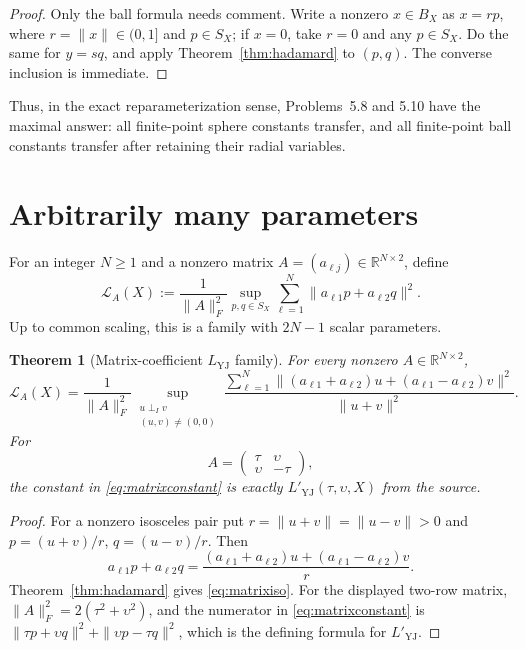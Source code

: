 \documentclass[11pt]{article}
\newtheorem{theorem}{Theorem}
\newcommand{\R}{\mathbb R}
\newcommand{\SX}{S_X}
\newcommand{\BX}{B_X}
\newcommand{\perpI}{\mathrel{\perp_I}}
\newcommand{\Lcal}{\mathcal L}
\begin{document}
\begin{proof}
Only the ball formula needs comment.  Write a nonzero $x\in\BX$ as
$x=r p$, where $r=\|x\|\in(0,1]$ and $p\in\SX$; if $x=0$, take $r=0$ and
any $p\in\SX$.  Do the same for $y=sq$, and apply
Theorem~\ref{thm:hadamard} to $(p,q)$.  The converse inclusion is immediate.
\end{proof}

Thus, in the exact reparameterization sense, Problems~5.8 and 5.10 have the
maximal answer: all finite-point sphere constants transfer, and all
finite-point ball constants transfer after retaining their radial variables.

\section{Arbitrarily many parameters}

For an integer $N\geq1$ and a nonzero matrix
$A=(a_{\ell j})\in\R^{N\times2}$, define
\begin{equation}\label{eq:matrixconstant}
 \Lcal_A(X):=\frac{1}{\|A\|_{F}^{2}}
 \sup_{p,q\in\SX}\sum_{\ell=1}^{N}
 \|a_{\ell1}p+a_{\ell2}q\|^2.
\end{equation}
Up to common scaling, this is a family with $2N-1$ scalar parameters.

\begin{theorem}[Matrix-coefficient $L_{\mathrm{YJ}}$ family]\label{thm:matrix}
For every nonzero $A\in\R^{N\times2}$,
\begin{equation}\label{eq:matrixiso}
 \Lcal_A(X)=\frac{1}{\|A\|_F^2}
 \sup_{\substack{u\perpI v\\(u,v)\ne(0,0)}}
 \frac{\displaystyle\sum_{\ell=1}^{N}
 \|(a_{\ell1}+a_{\ell2})u+(a_{\ell1}-a_{\ell2})v\|^2}
 {\|u+v\|^2}.
\end{equation}
For
\[
 A=\begin{pmatrix}\tau&\upsilon\\ \upsilon&-\tau\end{pmatrix},
\]
the constant in \eqref{eq:matrixconstant} is exactly
$L'_{\mathrm{YJ}}(\tau,\upsilon,X)$ from the source.
\end{theorem}

\begin{proof}
For a nonzero isosceles pair put $r=\|u+v\|=\|u-v\|>0$ and
$p=(u+v)/r$, $q=(u-v)/r$.  Then
\[
 a_{\ell1}p+a_{\ell2}q
 =\frac{(a_{\ell1}+a_{\ell2})u+(a_{\ell1}-a_{\ell2})v}{r}.
\]
Theorem~\ref{thm:hadamard} gives \eqref{eq:matrixiso}.  For the displayed
two-row matrix, $\|A\|_F^2=2(\tau^2+\upsilon^2)$, and the numerator in
\eqref{eq:matrixconstant} is
$\|\tau p+\upsilon q\|^2+\|\upsilon p-\tau q\|^2$, which is the defining
formula for $L'_{\mathrm{YJ}}$.
\end{proof}
\end{document}

